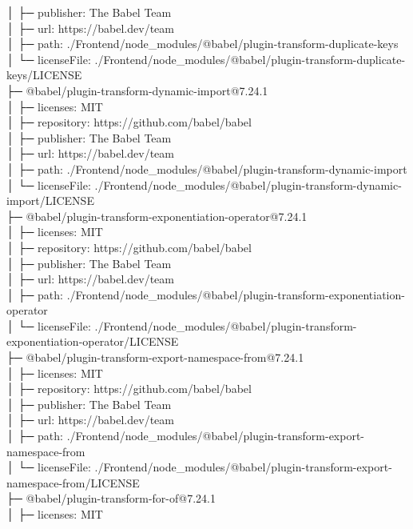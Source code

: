 \documentclass[
    paper=a4,
    twoside=false,
    parskip=half,
    listof=entryprefix,
    listof=totoc,
    index=totoc,
    bibliography=totoc,
    headsepline,
]{scrbook}
\begin{document}
    │  ├─ publisher: The Babel Team\\
    │  ├─ url: https://babel.dev/team\\
    │  ├─ path: ./Frontend/node\_modules/@babel/plugin-transform-duplicate-keys\\
    │  └─ licenseFile: ./Frontend/node\_modules/@babel/plugin-transform-duplicate-keys/LICENSE\\
    ├─ @babel/plugin-transform-dynamic-import@7.24.1\\
    │  ├─ licenses: MIT\\
    │  ├─ repository: https://github.com/babel/babel\\
    │  ├─ publisher: The Babel Team\\
    │  ├─ url: https://babel.dev/team\\
    │  ├─ path: ./Frontend/node\_modules/@babel/plugin-transform-dynamic-import\\
    │  └─ licenseFile: ./Frontend/node\_modules/@babel/plugin-transform-dynamic-import/LICENSE\\
    ├─ @babel/plugin-transform-exponentiation-operator@7.24.1\\
    │  ├─ licenses: MIT\\
    │  ├─ repository: https://github.com/babel/babel\\
    │  ├─ publisher: The Babel Team\\
    │  ├─ url: https://babel.dev/team\\
    │  ├─ path: ./Frontend/node\_modules/@babel/plugin-transform-exponentiation-operator\\
    │  └─ licenseFile: ./Frontend/node\_modules/@babel/plugin-transform-exponentiation-operator/LICENSE\\
    ├─ @babel/plugin-transform-export-namespace-from@7.24.1\\
    │  ├─ licenses: MIT\\
    │  ├─ repository: https://github.com/babel/babel\\
    │  ├─ publisher: The Babel Team\\
    │  ├─ url: https://babel.dev/team\\
    │  ├─ path: ./Frontend/node\_modules/@babel/plugin-transform-export-namespace-from\\
    │  └─ licenseFile: ./Frontend/node\_modules/@babel/plugin-transform-export-namespace-from/LICENSE\\
    ├─ @babel/plugin-transform-for-of@7.24.1\\
    │  ├─ licenses: MIT\\
\end{document}
